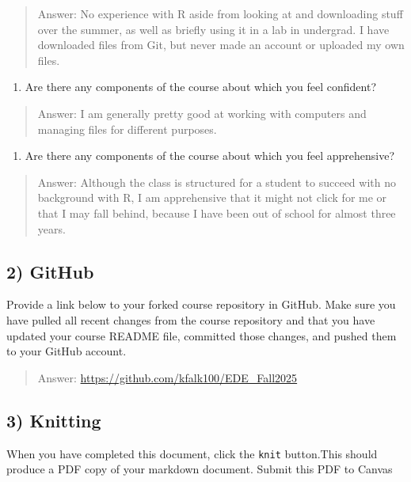 \documentclass[
]{article}
\providecommand{\tightlist}{%
  \setlength{\itemsep}{0pt}\setlength{\parskip}{0pt}}
\begin{document}
\begin{quote}
Answer: No experience with R aside from looking at and downloading stuff
over the summer, as well as briefly using it in a lab in undergrad. I
have downloaded files from Git, but never made an account or uploaded my
own files.
\end{quote}

\begin{enumerate}
\def\labelenumi{\arabic{enumi}.}
\setcounter{enumi}{1}
\tightlist
\item
  Are there any components of the course about which you feel confident?
\end{enumerate}

\begin{quote}
Answer: I am generally pretty good at working with computers and
managing files for different purposes.
\end{quote}

\begin{enumerate}
\def\labelenumi{\arabic{enumi}.}
\setcounter{enumi}{2}
\tightlist
\item
  Are there any components of the course about which you feel
  apprehensive?
\end{enumerate}

\begin{quote}
Answer: Although the class is structured for a student to succeed with
no background with R, I am apprehensive that it might not click for me
or that I may fall behind, because I have been out of school for almost
three years.
\end{quote}

\subsection{2) GitHub}\label{github}

Provide a link below to your forked course repository in GitHub. Make
sure you have pulled all recent changes from the course repository and
that you have updated your course README file, committed those changes,
and pushed them to your GitHub account.

\begin{quote}
Answer: \url{https://github.com/kfalk100/EDE_Fall2025}
\end{quote}

\subsection{3) Knitting}\label{knitting}

When you have completed this document, click the \texttt{knit}
button.This should produce a PDF copy of your markdown document. Submit
this PDF to Canvas
\end{document}

